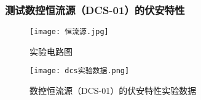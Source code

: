 \documentclass[dvipsnames, svgnames,a4paper,11pt]{article}
\begin{document}
				\subsubsection{测试数控恒流源（DCS-01）的伏安特性}
				\begin{figure}[H]
					\centering
					\begin{minipage}[b]{0.5\linewidth}
						\centering
						\texttt{[image: 恒流源.jpg]}
						\caption{实验电路图}
						\label{内接法电路图}
					\end{minipage}
					\hfill
					\begin{minipage}[b]{0.4\linewidth}
						\centering
						\texttt{[image: dcs实验数据.png]}
						\caption{数控恒流源（DCS-01）的伏安特性实验数据}
						\label{dcs实验数据}
					\end{minipage}
				\end{figure}
				
\end{document}
